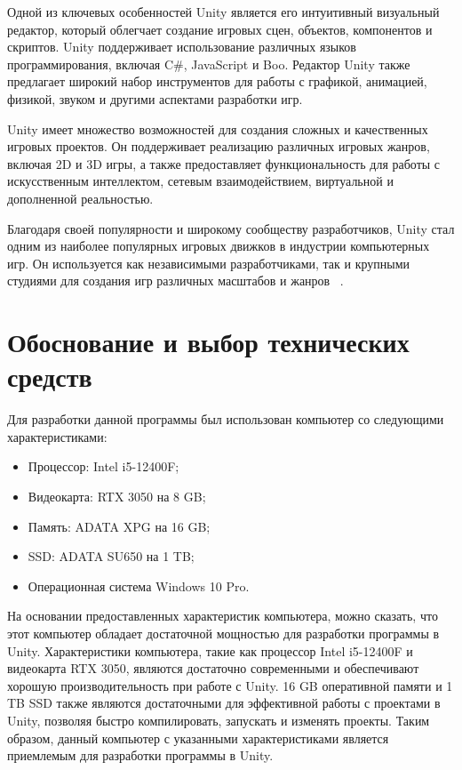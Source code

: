 Одной из ключевых особенностей Unity является его интуитивный визуальный редактор, который облегчает создание игровых сцен, объектов, компонентов и скриптов. Unity поддерживает использование различных языков программирования, включая C\#, JavaScript и Boo. Редактор Unity также предлагает широкий набор инструментов для работы с графикой, анимацией, физикой, звуком и другими аспектами разработки игр.

Unity имеет множество возможностей для создания сложных и качественных игровых проектов. Он поддерживает реализацию различных игровых жанров, включая 2D и 3D игры, а также предоставляет функциональность для работы с искусственным интеллектом, сетевым взаимодействием, виртуальной и дополненной реальностью.

Благодаря своей популярности и широкому сообществу разработчиков, Unity стал одним из наиболее популярных игровых движков в индустрии компьютерных игр. Он используется как независимыми разработчиками, так и крупными студиями для создания игр различных масштабов и жанров ~\cite{book5author,wikiRUUnity}.

\section{\label{sec:ch01/sec04} Обоснование и выбор технических средств}
Для разработки данной программы был использован компьютер со следующими характеристиками:
\begin{itemize}
    \item Процессор: Intel i5-12400F;
    \item Видеокарта: RTX 3050 на 8 GB;
    \item Память: ADATA XPG на 16 GB;
    \item SSD: ADATA SU650 на 1 TB;
    \item Операционная система Windows 10 Pro.
\end{itemize}
На основании предоставленных характеристик компьютера, можно сказать, что этот компьютер обладает достаточной мощностью для разработки программы в Unity.
Характеристики компьютера, такие как процессор Intel i5-12400F и видеокарта RTX 3050, являются достаточно современными и обеспечивают хорошую производительность при работе с Unity. 16 GB оперативной памяти и 1 TB SSD также являются достаточными для эффективной работы с проектами в Unity, позволяя быстро компилировать, запускать и изменять проекты.
Таким образом, данный компьютер с указанными характеристиками является приемлемым для разработки программы в Unity.

